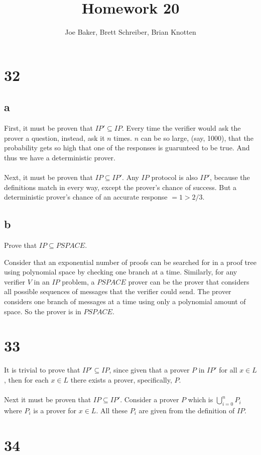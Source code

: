\documentclass[letterpaper,notitlepage,twoside]{article}
\begin{document}
\title{Homework 20}
\author{Joe Baker, Brett Schreiber, Brian Knotten}
\maketitle

\section*{32}
\subsection*{a}
First, it must be proven that $IP' \subseteq IP$.
Every time the verifier would ask the prover a question, instead, ask it $n$ times. $n$ can be so large, (say, 1000), that the
probability gets so high that one of the responses is guarunteed to be true. And thus we have a deterministic prover. \\\\

Next, it must be proven that $IP \subseteq IP'$.
Any $IP$ protocol is also $IP'$, because the definitions match in every way, except the prover's chance of success.
But a deterministic prover's chance of an accurate response $= 1 > 2/3$.

\subsection*{b}
Prove that $IP \subseteq PSPACE$.

Consider that an exponential number of proofs can be searched for in a proof tree using polynomial space by checking one branch at a time. Similarly, for any verifier $V$ in an $IP$ problem, a $PSPACE$ prover can be the prover that considers all possible sequences of messages that the verifier could send. The prover considers one branch of messages at a time using only a polynomial amount of space. So the prover is in $PSPACE$.

\section*{33}
It is trivial to prove that $IP' \subseteq IP$, since given that a prover $P$ in $IP'$ for all $x \in L$, then for each $x \in L$ there exists a prover, specifically, $P$. \\\\

Next it must be proven that $IP \subseteq IP'$. Consider a prover $P$ which is $\bigcup_{i = 0}^n P_i$ where $P_i$ is a prover for $x \in L$. All these $P_i$ are given from the definition of $IP$. 

\section*{34}
\end{document}
